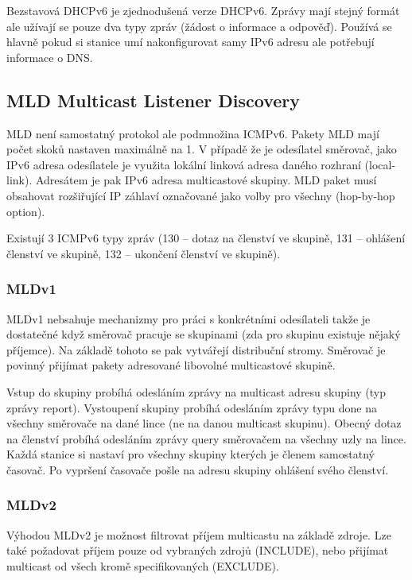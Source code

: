 Bezstavová DHCPv6 je zjednodušená verze DHCPv6.
Zprávy mají stejný formát ale užívají se pouze dva typy zpráv (žádost o informace a odpověď).
Používá se hlavně pokud si stanice umí nakonfigurovat samy IPv6 adresu ale potřebují informace o DNS.

\subsection{MLD Multicast Listener Discovery}

MLD není samostatný protokol ale podmnožina ICMPv6.
Pakety MLD mají počet skoků nastaven maximálně na 1.
V případě že je odesílatel směrovač, jako IPv6 adresa odesílatele je využita lokální linková adresa daného rozhraní (local-link).
Adresátem je pak IPv6 adresa multicastové skupiny.
MLD paket musí obsahovat rozšiřující IP záhlaví označované jako volby pro všechny (hop-by-hop option).

Existují 3 ICMPv6 typy zpráv (130 -- dotaz na členství ve skupině, 131 -- ohlášení členství ve skupině, 132 -- ukončení členství ve skupině).


\subsubsection{MLDv1}

MLDv1 nebsahuje mechanizmy pro práci s konkrétními odesílateli takže je dostatečné když směrovač pracuje se skupinami (zda pro skupinu existuje nějaký příjemce).
Na základě tohoto se pak vytvářejí distribuční stromy.
Směrovač je povinný přijímat pakety adresované libovolné multicastové skupině.

Vstup do skupiny probíhá odesláním zprávy na multicast adresu skupiny (typ zprávy report).
Vystoupení skupiny probíhá odesláním zprávy typu done na všechny směrovače na dané lince (ne na danou multicast skupinu).
Obecný dotaz na členství probíhá odesláním zprávy query směrovačem na všechny uzly na lince.
Každá stanice si nastaví pro všechny skupiny kterých je členem samostatný časovač.
Po vypršení časovače pošle na adresu skupiny ohlášení svého členství.

\subsubsection{MLDv2}

Výhodou MLDv2 je možnost filtrovat příjem multicastu na základě zdroje.
Lze také požadovat příjem pouze od vybraných zdrojů (INCLUDE), nebo přijímat multicast od všech kromě specifikovaných (EXCLUDE).

